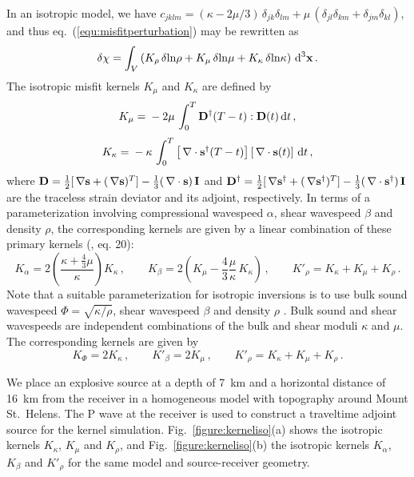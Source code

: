 \documentclass[referee,extra]{gji}
\newcommand{\bequ}{\begin{equation} }
\newcommand{\eequ}{\end{equation} }
\newcommand{\bnabla}{ \, {\bf \nabla } }
\newcommand{\bs}{ {\bf s } }
\newcommand{\bx}{ {\bf x } }
\newcommand{\bD}{ {\bf D } }
\renewcommand{\cite}[1]{\citet{#1}}
\begin{document}
In an isotropic model, we have
$c_{jklm} = ( \kappa - 2 \mu / 3 )\, \delta_{jk} \delta_{lm} + \mu\, ( \delta_{jl} \delta_{km} + \delta_{jm} \delta_{kl} ) $,
and thus eq.~(\ref{equ:misfitperturbation}) may be rewritten as
\bequ
\delta \chi = \int_V \left( K_\rho   \,\delta {\mathrm{ln}} \rho
+ K_\mu  \, \delta {\mathrm{ln}} \mu
+ K_\kappa   \, \delta {\mathrm{ln}} \kappa     \right) \, \mathrm{d}^3 \bx \, .
\eequ
The isotropic misfit kernels $K_\mu$ and $K_\kappa$ are defined by
\bequ \label{equ:kerneliso}
K_\mu     =  \mbox{}- 2 \mu   \,\int_0^T \bD^{\dag} (  T-t ) : \bD (t) \,\mathrm{d}t \,,
\eequ
\bequ
K_\kappa    =  \mbox{}- \kappa   \,\int_0^T  \left[ \bnabla \cdot \bs^\dag (  T-t ) \right] \left[ \bnabla \cdot \bs (  t ) \right]\, \mathrm{d}t \,,
\eequ
where $\bD =  \frac{1}{2} [ \bnabla \bs + ( \bnabla \bs )^T ] - \frac{1}{3}( \bnabla \cdot \bs )\, {\bf I} $
and $\bD^\dag = \frac{1}{2} [ \bnabla \bs^\dag + ( \bnabla \bs^\dag )^T ] - \frac{1}{3}( \bnabla \cdot \bs^\dag )\, {\bf I} $
are the traceless strain deviator and its adjoint, respectively.
In terms of a parameterization involving compressional wavespeed $\alpha$, shear wavespeed $\beta$
and density $\rho$, the corresponding kernels are given by a linear combination of these primary kernels (\cite{TrTaLi05}, eq. 20):
\bequ \label{equ:kernelalpha}
K_\alpha    = 2 \left( \frac{\kappa + \frac{4}{3} \mu}{\kappa} \right) K_\kappa  \,,
\qquad
K_\beta  = 2 \left( K_\mu    - \frac{4}{3} \frac{\mu}{\kappa}\, K_\kappa \right)\,,
\qquad
K'_{\rho}   = K_\kappa   + K_\mu   + K_\rho  \,.
\eequ
Note that a suitable parameterization for isotropic inversions is to use bulk sound
wavespeed $\Phi= \sqrt{\kappa/\rho}$, shear wavespeed $\beta$ and density $\rho$  \citep{Tar87}.
Bulk sound and shear wavespeeds are independent combinations of the bulk and shear moduli $\kappa$ and $\mu$.
The corresponding kernels are given by
\bequ \label{equ:kernelbulk}
K_\Phi   = 2 K_\kappa  \,,
\qquad
K'_\beta  = 2 K_\mu  \,,
\qquad
K'_{\rho}   = K_\kappa   + K_\mu   + K_\rho  \,.
\eequ

We place an explosive source at a depth of 7~km and a horizontal distance of 16~km from the receiver
in a homogeneous model with topography around Mount St.~Helens.
The P wave at the receiver is used to construct a traveltime adjoint source for the kernel simulation.
Fig.~\ref{figure:kerneliso}(a) shows the isotropic kernels $K_\kappa$, $K_\mu$ and $K_\rho$, and
Fig.~\ref{figure:kerneliso}(b) the isotropic kernels $K_\alpha$, $K_\beta$ and $K'_{\rho}$
for the same model and source-receiver geometry.
\end{document}
